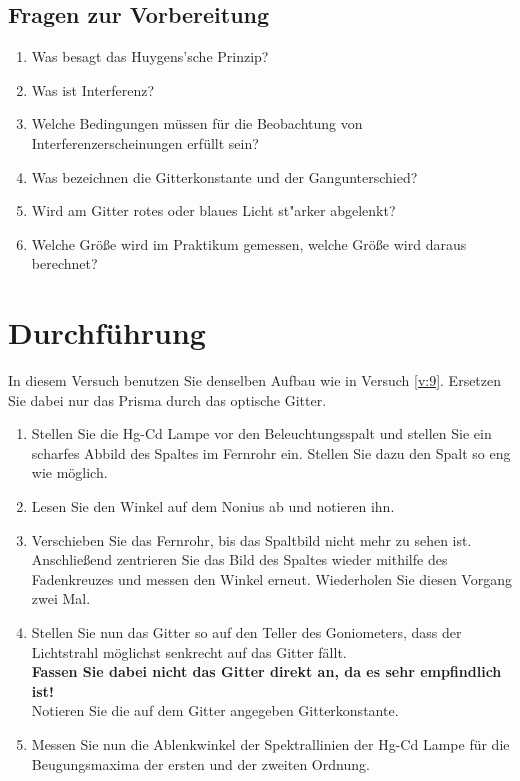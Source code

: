 \begin{tutorhint}
\section{Fragen zur Vorbereitung}

\begin{enumerate}
 \item Was besagt das Huygens'sche Prinzip?
 \item Was ist Interferenz?
 \item Welche Bedingungen müssen für die Beobachtung von Interferenzerscheinungen erfüllt sein?
 \item Was bezeichnen die Gitterkonstante und der Gangunterschied?
 \item Wird am Gitter rotes oder blaues Licht st"arker abgelenkt?
 \item Welche Größe wird im Praktikum gemessen, welche Größe wird daraus berechnet?
\end{enumerate}
\end{tutorhint}

\section{Durchführung} 

In diesem Versuch benutzen Sie denselben Aufbau wie in Versuch \ref{v:9}. Ersetzen Sie dabei nur das Prisma durch das optische Gitter.
\begin{enumerate}
	\item Stellen Sie die Hg-Cd Lampe vor den Beleuchtungsspalt und stellen Sie ein scharfes Abbild des Spaltes im Fernrohr ein. Stellen Sie dazu den Spalt so eng wie möglich.
	\item Lesen Sie den Winkel auf dem Nonius ab und notieren ihn. 
	\item Verschieben Sie das Fernrohr, bis das Spaltbild nicht mehr zu sehen ist. Anschließend zentrieren Sie das Bild des Spaltes wieder mithilfe des Fadenkreuzes und messen den Winkel erneut. Wiederholen Sie diesen Vorgang zwei Mal.
	\item Stellen Sie nun das Gitter so auf den Teller des Goniometers, dass der Lichtstrahl möglichst senkrecht auf das Gitter fällt. \\
	\textbf{Fassen Sie dabei nicht das Gitter direkt an, da es sehr empfindlich ist!}\\
	Notieren Sie die auf dem Gitter angegeben Gitterkonstante.
	\item Messen Sie nun die Ablenkwinkel der Spektrallinien der Hg-Cd Lampe für die Beugungsmaxima der ersten  und der zweiten Ordnung. 
\end{enumerate}
